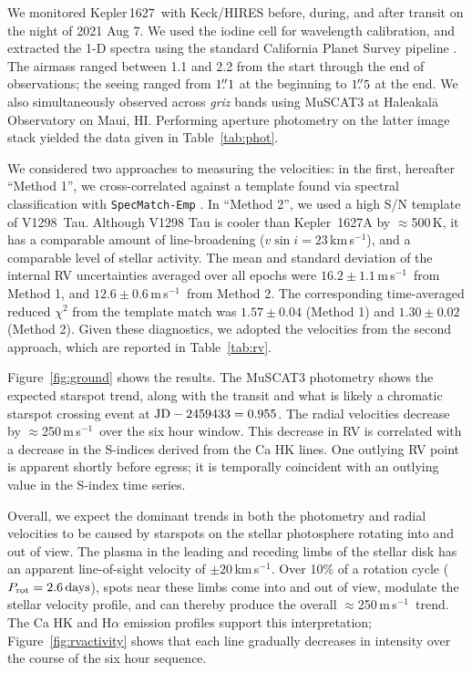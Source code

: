 \documentclass[12pt,modern,twocolumn,tighten,linenumbers,trackchanges]{aastex63}
\newcommand{\sn}{Kepler\,1627} %
\newcommand{\kms}{\,km\,s$^{-1}$}
\newcommand{\ms}{\,m\,s$^{-1}$}
\begin{document}
We monitored \sn\ with Keck/HIRES before, during, and after transit on
the night of 2021 Aug 7.  We used the iodine cell for wavelength
calibration, and extracted the 1-D spectra using the
standard California Planet Survey pipeline \citep{howard_cps_2010}.
The airmass ranged between 1.1 and 2.2 from the start through the end
of observations; the seeing ranged from $1\mbox{$.\!\!^{\prime\prime}$}1$ at the beginning to
$1\mbox{$.\!\!^{\prime\prime}$}5$ at the end.  We also simultaneously observed across {\it
griz} bands using MuSCAT3 at Haleakal\=a Observatory on Maui, HI.
Performing aperture photometry on the latter image stack yielded the
data given in Table~\ref{tab:phot}.

We considered two approaches to measuring the velocities: in the
first, hereafter ``Method 1'', we cross-correlated against a template
found via spectral classification with \texttt{SpecMatch-Emp}
\citep{yee_SM_2017}.  In ``Method 2'', we used a high S/N template of
V1298~Tau.  Although V1298 Tau is cooler than Kepler~1627A by
$\approx$500\,K, it has a comparable amount of line-broadening ($v\sin
i = 23$\kms), and a comparable level of stellar activity.  The mean
and standard deviation of the internal RV uncertainties averaged over
all epochs were $16.2\pm1.1$\ms\ from Method 1, and $12.6\pm0.6$\ms\
from Method 2.  The corresponding time-averaged reduced $\chi^2$ from
the template match was $1.57\pm0.04$ (Method 1) and $1.30\pm0.02$
(Method 2).  Given these diagnostics, we adopted the velocities from
the second approach, which are reported in Table~\ref{tab:rv}.

Figure~\ref{fig:ground} shows the results.  The MuSCAT3 photometry
shows the expected starspot trend, along with the transit and what is
likely a chromatic starspot crossing event at ${\rm JD} - 2459433 =
0.955$.  The radial velocities decrease by $\approx$250\ms\ over the
six hour window.  This decrease in RV is correlated with a decrease in
the S-indices derived from the Ca HK lines.  One outlying RV point is
apparent shortly before egress; it is temporally coincident with an
outlying value in the S-index time series.

Overall, we expect the dominant trends in both the photometry and
radial velocities to be caused by starspots on the stellar photosphere
rotating into and out of view.  The plasma in the leading and receding
limbs of the stellar disk has an apparent line-of-sight velocity of
$\pm 20$\kms.  Over 10\% of a rotation cycle ($P_{\rm rot}=2.6\,{\rm
days}$), spots near these limbs come into and out of view, modulate
the stellar velocity profile, and can thereby produce the overall
$\approx$250\ms\ trend.  The Ca HK and H$\alpha$ emission profiles
support this interpretation; Figure~\ref{fig:rvactivity} shows that
each line gradually decreases in intensity over the course of the six
hour sequence.
\end{document}
